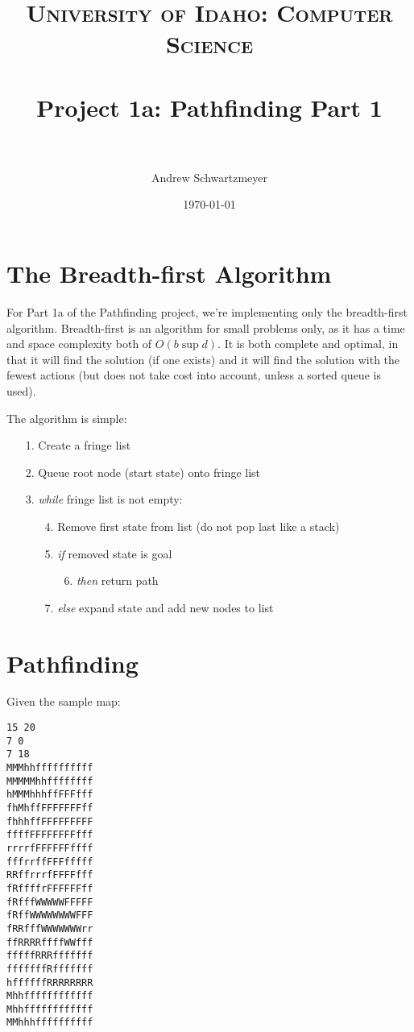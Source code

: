 \documentclass[12pt, letter]{scrartcl}
\title{	
\normalfont \normalsize 
\textsc{University of Idaho: Computer Science} \\ [25pt]
\horrule{0.5pt} \\[0.4cm]
\huge Project 1a: Pathfinding Part 1 \\
\horrule{2pt} \\[0.5cm]
}
\author{Andrew Schwartzmeyer}
\date{\normalsize\today}
\begin{document}
\maketitle %

\section{The Breadth-first Algorithm}
For Part 1a of the Pathfinding project, we're implementing only the breadth-first algorithm. Breadth-first is an algorithm for small problems only, as it has a time and space complexity both of $O(b\sup{d})$. It is both complete and optimal, in that it will find the solution (if one exists) and it will find the solution with the fewest actions (but does not take cost into account, unless a sorted queue is used).

The algorithm is simple: 
\begin{enumerate}
    \item[1. ] Create a fringe list
    \item[2. ] Queue root node (start state) onto fringe list
    \item[3. ] \emph{while} fringe list is not empty:
        \begin{enumerate}
    \item[4. ] Remove first state from list (do not pop last like a stack)
    \item[5. ] \emph{if} removed state is goal
        \begin{enumerate}
    \item[6. ] \emph{then} return path
        \end{enumerate}
    \item[7. ] \emph{else} expand state and add new nodes to list
        \end{enumerate}
\end{enumerate}

\section{Pathfinding}
Given the sample map:
\begin{verbatim}
15 20
7 0
7 18
MMMhhffffffffff
MMMMMhhffffffff
hMMMhhhffFFFfff
fhMhffFFFFFFFff
fhhhffFFFFFFFFF
ffffFFFFFFFFfff
rrrrfFFFFFFffff
fffrrffFFFfffff
RRffrrrfFFFFfff
fRffffrFFFFFFff
fRfffWWWWWFFFFF
fRffWWWWWWWWFFF
fRRfffWWWWWWWrr
ffRRRRffffWWfff
fffffRRRfffffff
fffffffRfffffff
hffffffRRRRRRRR
Mhhffffffffffff
Mhhffffffffffff
MMhhhffffffffff
\end{verbatim}
\end{document}

